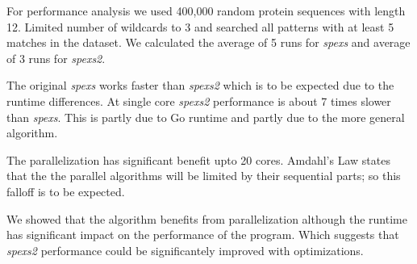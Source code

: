 For performance analysis we used 400,000 random protein sequences with length 12. Limited number of wildcards to 3 and searched all patterns with at least 5 matches in the dataset. We calculated the average of 5 runs for \emph{spexs} and average of 3 runs for \emph{spexs2}.

\begin{figure}[H]
\end{figure}

The original \emph{spexs} works faster than \emph{spexs2} which is to be expected due to the runtime differences. At single core \emph{spexs2} performance is about 7 times slower than \emph{spexs}. This is partly due to Go runtime and partly due to the more general algorithm.

The parallelization has significant benefit upto 20 cores. Amdahl's Law \cite{AmdahlsReval} states that the the parallel algorithms will be limited by their sequential parts; so this falloff is to be expected.

We showed that the algorithm benefits from parallelization although the runtime has significant impact on the performance of the program. Which suggests that \emph{spexs2} performance could be significantely improved with optimizations.